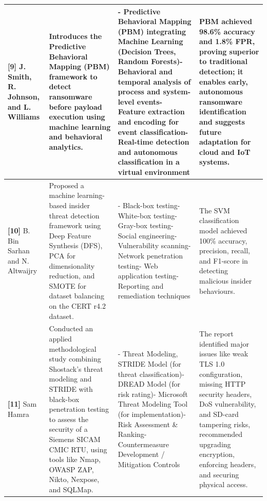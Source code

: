 \begin{scriptsize}
\begin{longtable}{|p{1.8cm}|p{4.2cm}|p{4.0cm}|p{3.8cm}|}
\hline
\textbf{[9]} J. Smith, R. Johnson, and L. Williams & Introduces the Predictive Behavioral Mapping (PBM) framework to detect ransomware before payload execution using machine learning and behavioral analytics. & - Predictive Behavioral Mapping (PBM) integrating Machine Learning (Decision Trees, Random Forests)\newline - Behavioral and temporal analysis of process and system-level events\newline - Feature extraction and encoding for event classification\newline - Real-time detection and autonomous classification in a virtual environment & PBM achieved 98.6\% accuracy and 1.8\% FPR, proving superior to traditional detection; it enables early, autonomous ransomware identification and suggests future adaptation for cloud and IoT systems. \\
\hline
\textbf{[10]} B. Bin Sarhan and N. Altwaijry & Proposed a machine learning-based insider threat detection framework using Deep Feature Synthesis (DFS), PCA for dimensionality reduction, and SMOTE for dataset balancing on the CERT r4.2 dataset. & - Black-box testing\newline - White-box testing\newline - Gray-box testing\newline - Social engineering\newline - Vulnerability scanning\newline - Network penetration testing\newline - Web application testing\newline - Reporting and remediation techniques & The SVM classification model achieved 100\% accuracy, precision, recall, and F1-score in detecting malicious insider behaviours. \\
\hline
\textbf{[11]} Sam Hamra & Conducted an applied methodological study combining Shostack's threat modeling and STRIDE with black-box penetration testing to assess the security of a Siemens SICAM CMIC RTU, using tools like Nmap, OWASP ZAP, Nikto, Nexpose, and SQLMap. & - Threat Modeling, STRIDE Model (for threat classification)\newline - DREAD Model (for risk rating)\newline - Microsoft Threat Modeling Tool (for implementation)\newline - Risk Assessment \& Ranking\newline - Countermeasure Development / Mitigation Controls & The report identified major issues like weak TLS 1.0 configuration, missing HTTP security headers, DoS vulnerability, and SD-card tampering risks, recommended upgrading encryption, enforcing headers, and securing physical access. \\

\end{longtable}
\end{scriptsize}
